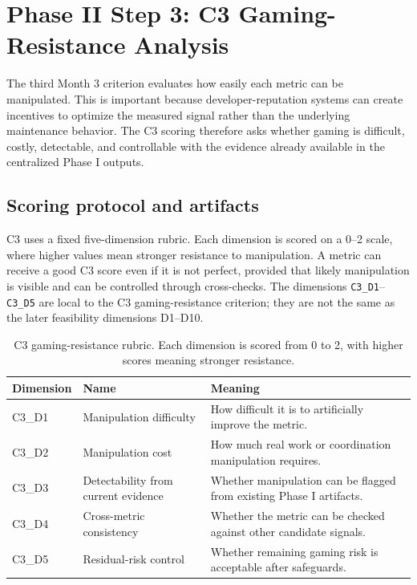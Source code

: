 \section{Phase II Step 3: C3 Gaming-Resistance Analysis}
\label{sec:phase2_c3_gaming_resistance}

The third Month 3 criterion evaluates how easily each metric can be manipulated. This is important because
developer-reputation systems can create incentives to optimize the measured signal rather than the underlying
maintenance behavior. The C3 scoring therefore asks whether gaming is difficult, costly, detectable, and
controllable with the evidence already available in the centralized Phase I outputs.

\subsection{Scoring protocol and artifacts}
\label{sec:c3_protocol_artifacts}

C3 uses a fixed five-dimension rubric. Each dimension is scored on a 0--2 scale, where higher values mean
stronger resistance to manipulation. A metric can receive a good C3 score even if it is not perfect, provided
that likely manipulation is visible and can be controlled through cross-checks. The dimensions
\texttt{C3\_D1}--\texttt{C3\_D5} are local to the C3 gaming-resistance criterion; they are not the same as
the later feasibility dimensions D1--D10.

\begin{table}[H]
\centering
\scriptsize
\renewcommand{\arraystretch}{1.08}
\begin{tabularx}{\textwidth}{p{2.1cm}p{3.7cm}X}
\toprule
\textbf{Dimension} & \textbf{Name} & \textbf{Meaning} \\
\midrule
C3\_D1 & Manipulation difficulty & How difficult it is to artificially improve the metric. \\
C3\_D2 & Manipulation cost & How much real work or coordination manipulation requires. \\
C3\_D3 & Detectability from current evidence & Whether manipulation can be flagged from existing Phase I artifacts. \\
C3\_D4 & Cross-metric consistency & Whether the metric can be checked against other candidate signals. \\
C3\_D5 & Residual-risk control & Whether remaining gaming risk is acceptable after safeguards. \\
\bottomrule
\end{tabularx}
\caption{C3 gaming-resistance rubric. Each dimension is scored from 0 to 2, with higher scores meaning stronger resistance.}
\label{tab:c3_rubric}
\end{table}

